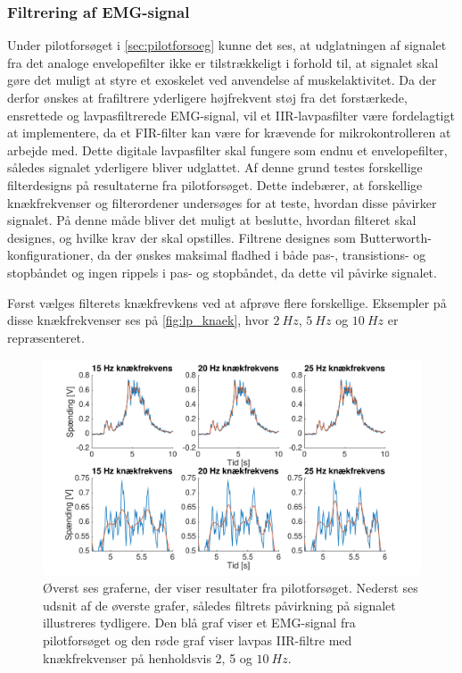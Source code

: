 \subsubsection{Filtrering af EMG-signal} \label{sec:lavpas_krav}
Under pilotforsøget i \autoref{sec:pilotforsoeg} kunne det ses, at udglatningen af signalet fra det analoge envelopefilter ikke er tilstrækkeligt i forhold til, at signalet skal gøre det muligt at styre et exoskelet ved anvendelse af muskelaktivitet. Da der derfor ønskes at frafiltrere yderligere højfrekvent støj fra det forstærkede, ensrettede og lavpasfiltrerede EMG-signal, vil et IIR-lavpasfilter være fordelagtigt at implementere, da et FIR-filter kan være for krævende for mikrokontrolleren at arbejde med. Dette digitale lavpasfilter skal fungere som endnu et envelopefilter, således signalet yderligere bliver udglattet. Af denne grund testes forskellige filterdesigns på resultaterne fra pilotforsøget. Dette indebærer, at forskellige knækfrekvenser og filterordener undersøges for at teste, hvordan disse påvirker signalet. På denne måde bliver det muligt at beslutte, hvordan filteret skal designes, og hvilke krav der skal opstilles. Filtrene designes som Butterworth-konfigurationer, da der ønskes maksimal fladhed i både pas-, transistions- og stopbåndet og ingen rippels i pas- og stopbåndet, da dette vil påvirke signalet.

Først vælges filterets knækfrevkens ved at afprøve flere forskellige. Eksempler på disse knækfrekvenser ses på \autoref{fig:lp_knaek}, hvor $2~Hz$, $5~Hz$ og $10~Hz$ er repræsenteret. 

\begin{figure} [H]
\centering
\includegraphics[width=1.0\textwidth]{figures/problemloesning/lavpas_knaek.pdf}
\caption{Øverst ses graferne, der viser resultater fra pilotforsøget. Nederst ses udsnit af de øverste grafer, således filtrets påvirkning på signalet illustreres tydligere. Den blå graf viser et EMG-signal fra pilotforsøget og den røde graf viser lavpas IIR-filtre med knækfrekvenser på henholdsvis 2, 5 og $10~Hz$.}
\label{fig:lp_knaek}
\end{figure} 

